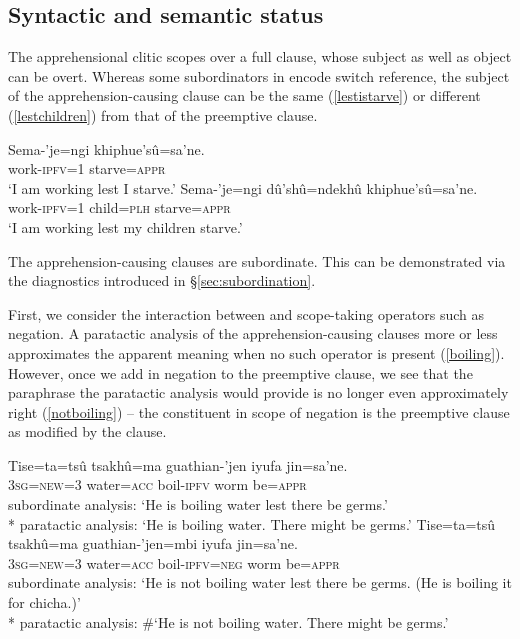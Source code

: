\documentclass[output=paper,colorlinks,citecolor=brown]{langscibook}
\begin{document}
\subsection{Syntactic and semantic status}

The apprehensional clitic  scopes over a full clause, whose subject as well as object can be overt. Whereas some subordinators in  encode switch reference, the subject of the apprehension-causing  clause can be the same (\ref{lestistarve}) or different (\ref{lestchildren}) from that of the preemptive clause.
\begin{exe}
    \ex \label{lestistarve} %
    \gll Sema-'je=ngi   {\ob}khiphue'sû=sa'ne.{\cb} \\
        work-\textsc{ipfv=1} starve=\textsc{appr} \\
    \glt `I am working lest I starve.' 
    \ex \label{lestchildren}%
    \gll Sema-'je=ngi  {\ob}dû'shû=ndekhû khiphue'sû=sa'ne.{\cb} \\
        work-\textsc{ipfv=1} child=\textsc{plh}        starve=\textsc{appr} \\
    \glt `I am working lest my children starve.' 
\end{exe}

The apprehension-causing  clauses are subordinate. This can be demonstrated via the diagnostics introduced in \S\ref{sec:subordination}.

First, we consider the interaction between  and scope-taking operators such as negation. A paratactic analysis of the apprehension-causing  clauses more or less approximates the apparent meaning when no such operator is present (\ref{boiling}). However, once we add in negation to the preemptive clause, we see that the paraphrase the paratactic analysis would provide is no longer even approximately right (\ref{notboiling}) -- the constituent in scope of negation is the preemptive clause as modified by the  clause.
\begin{exe}
    \ex \label{boiling}
    \gll Tise=ta=tsû tsakhû=ma guathian-'jen {\ob}iyufa jin=sa'ne.{\cb} \\
         \textsc{3sg=new=3} water=\textsc{acc} boil-\textsc{ipfv} worm be=\textsc{appr}   \\
    \glt subordinate analysis: `He is boiling water lest there be germs.' \\*
    paratactic analysis: `He is boiling water. There might be germs.'
    \ex \label{notboiling}
    \gll  Tise=ta=tsû tsakhû=ma guathian-'jen=mbi {\ob}iyufa jin=sa'ne.{\cb} \\
          \textsc{3sg=new=3} water=\textsc{acc} boil-\textsc{ipfv=neg} worm be=\textsc{appr}   \\
    \glt subordinate analysis: `He is not boiling water lest there be germs. (He is boiling it for chicha.)' \\*
    paratactic analysis: \#`He is not boiling water. There might be germs.'
\end{exe}
    
\end{document}
